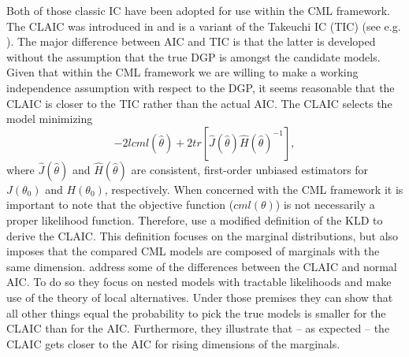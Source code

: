 \documentclass[12pt, a4paper]{article}
\numberwithin{defcounter}{section}
\numberwithin{excounter}{section}
\begin{document}
Both of those classic \ac{IC} have been adopted for use within the \ac{CML} framework. The \ac{CLAIC} was introduced in \cite{varin2005} and is a variant of the Takeuchi \ac{IC} (TIC) (see e.g. \citep[43f]{claeskens2008}). The major difference between \ac{AIC} and TIC is that the latter is developed without the assumption that the true \ac{DGP} is amongst the candidate models. Given that within the \ac{CML} framework we are willing to make a working independence assumption with respect to the \ac{DGP}, it seems reasonable that the \ac{CLAIC} is closer to the TIC rather than the actual \ac{AIC}. The \ac{CLAIC} selects the model minimizing
  \begin{equation}
 - 2lcml(\hat{\theta}) + 2tr[\hat{J}(\hat{\theta})\hat{H}(\hat{\theta})^{-1}], 
  \end{equation}
  where $\hat{J}(\hat{\theta})$ and $\hat{H}(\hat{\theta})$ are consistent, first-order unbiased
  estimators for $J(\theta_0)$ and $H(\theta_0)$, respectively. When concerned with the \ac{CML} framework it is important to note that the objective function ($cml(\theta)$) is not necessarily a proper likelihood function. Therefore, \cite{varin2005} use a modified definition of the \ac{KLD} to derive the \ac{CLAIC}. This definition focuses on the marginal distributions, but also imposes that the compared \ac{CML} models are composed of marginals with the same dimension. \cite{ng2014} address some of the differences between the \ac{CLAIC} and normal \ac{AIC}. To do so they focus on nested models with tractable likelihoods and make use of the theory of local alternatives. Under those premises they can show that all other things equal the probability to pick the true models is smaller for the \ac{CLAIC} than for the \ac{AIC}. Furthermore, they illustrate that -- as expected -- the \ac{CLAIC} gets closer to the \ac{AIC} for rising dimensions of the marginals.
  
\end{document}
